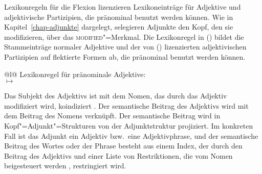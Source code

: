 {Lexikonregeln für die Flexion lizenzieren Lexikoneinträge für Adjektive und adjektivische
Partizipien, die pränominal benutzt werden können. Wie in Kapitel~\ref{chap-adjunkte}
dargelegt, selegieren Adjunkte den Kopf, den sie modifizieren, über das
\textsc{modified}"=Merkmal. Die Lexikonregel in () bildet die Stammeinträge
normaler Adjektive und der von () lizenzierten adjektivischen Partizipien
auf flektierte Formen ab, die pränominal benutzt werden können.
%
\eas
\label{lr-prenom-adj}
\begin{tabular}[t]{@{}l@{}}
Lexikonregel für pränominale Adjektive:\\
 $\mapsto$\\
\end{tabular}
\zs
%
Das Subjekt des Adjektivs ist mit dem Nomen, das durch das Adjektiv modifiziert wird, koindiziert .
Der semantische Beitrag des Adjektivs  wird mit dem Beitrag des Nomens  verknüpft. 
Der semantische Beitrag wird in Kopf"=Adjunkt"=Strukturen von der Adjunktstruktur projiziert.
Im konkreten Fall ist das Adjunkt ein Adjektiv bzw.\ eine Adjektivphrase, und der
semantische Beitrag des Wortes oder der Phrase besteht aus einem Index, der durch den Beitrag
des Adjektivs  und einer Liste von Restriktionen, die vom Nomen beigesteuert werden , restringiert wird.

}
